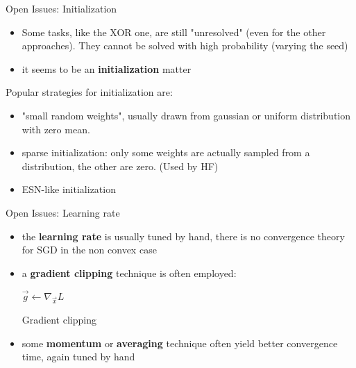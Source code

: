  
\begin{frame}{Open Issues: Initialization}
	
	\begin{itemize}
		\item Some tasks, like the XOR one, are still "unresolved" (even for the other approaches). They cannot be solved with high probability (varying the seed)
		\item it seems to be an \textbf{initialization} matter
	\end{itemize}
	
	Popular strategies for initialization are:
	\begin{itemize}
		\item "small random weights", usually drawn from gaussian or uniform distribution with zero mean. 
		\item sparse initialization: only some weights are actually sampled from a distribution, the other are zero. (Used by HF)
		\item ESN-like initialization
	\end{itemize}
	
\end{frame}

\begin{frame}{Open Issues: Learning rate}
	
	\begin{itemize}	
		\item 	the \textbf{learning rate} is usually tuned by hand, there is no convergence theory for SGD in the non convex case
		\item a \textbf{gradient clipping} technique is often employed:
		\begin{algorithm}[H]
			$\vec{g} \gets \nabla_{\vec{x}} L$\\
			\caption{Gradient clipping}
			\label{algo:gradClipping}
		\end{algorithm}
		
		\item  some \textbf{momentum} or \textbf{averaging} technique often yield better convergence time, again tuned by hand
	\end{itemize}
	

\end{frame}